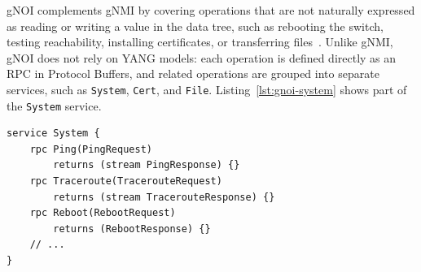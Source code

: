 gNOI complements gNMI by covering operations that are not naturally expressed as reading or writing a value in the data tree, such as rebooting the switch, testing reachability, installing certificates, or transferring files~\cite{gnoi}. Unlike gNMI, gNOI does not rely on YANG models: each operation is defined directly as an RPC in Protocol Buffers, and related operations are grouped into separate services, such as \texttt{System}, \texttt{Cert}, and \texttt{File}. Listing~\ref{lst:gnoi-system} shows part of the \texttt{System} service.

\begin{lstlisting}[language={},caption={Part of the gNOI \texttt{System} service.},label={lst:gnoi-system}]
service System {
    rpc Ping(PingRequest)
        returns (stream PingResponse) {}
    rpc Traceroute(TracerouteRequest)
        returns (stream TracerouteResponse) {}
    rpc Reboot(RebootRequest)
        returns (RebootResponse) {}
    // ...
}
\end{lstlisting}
